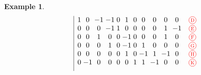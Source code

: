 \documentclass{amsart}
\theoremstyle{definition}
\newtheorem{example}[theorem]{Example}
\newcommand{\red}{\color{red}} %
\newcommand*\circled[1]{\tikz[baseline=(char.base)]{\node[shape=circle, draw, inner sep=1.5pt, scale=.7] (char) {#1};}}
\begin{document}
\begin{example}
\[\begin{array}{r|c@{\;}c@{\;}c@{\;}c@{\;}c@{\;}c@{\;}c@{\;}c@{\;}c@{\;}c@{\;}cc}
					& 1 & 0 & -1 & -1 & 0 & 1 & 0 & 0 & 0 & 0 & 0 & \red \circled{D} \\
					& 0 & 0 & 0 & -1 & 1 & 0 & 0 & 0 & 0 & 1 & -1 & \red \circled{E} \\
					& 0 & 0 & 1 & 0 & 0 & -1 & 0 & 0 & 0 & 1 & 0 & \red \circled{F}\\
					& 0 & 0 & 0 & 1 & 0 & -1 & 0 & 1 & 0 & 0 & 0 & \red \circled{G} \\
					& 0 & 0 & 0 & 0 & 0 & 1 & 0 & -1 & 1 & -1 & 0 & \red \circled{H} \\
					& 0 & -1 & 0 & 0 & 0 & 0 & 1 & 1 & -1 & 0 & 0 & \red \circled{K} \\[.2cm]
\end{array}
\]





\end{example}
\end{document}
